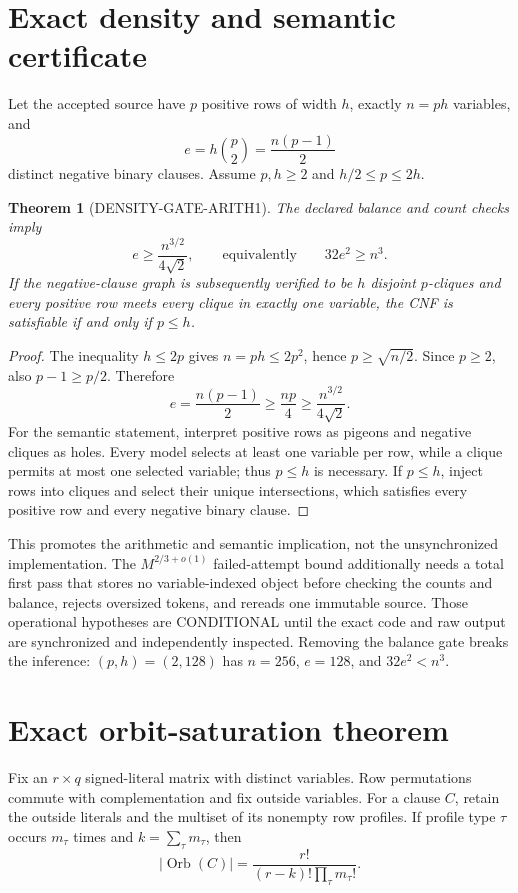 \documentclass[11pt]{article}
\newtheorem{theorem}{Theorem}
\begin{document}
\section{Exact density and semantic certificate}
Let the accepted source have $p$ positive rows of width $h$, exactly
$n=ph$ variables, and
\[
 e=h\binom p2=\frac{n(p-1)}2
\]
distinct negative binary clauses.  Assume $p,h\ge2$ and
$h/2\le p\le2h$.

\begin{theorem}[DENSITY-GATE-ARITH1]
The declared balance and count checks imply
\[
 e\ge \frac{n^{3/2}}{4\sqrt2},
 \qquad\text{equivalently}\qquad 32e^2\ge n^3.
\]
If the negative-clause graph is subsequently verified to be $h$ disjoint
$p$-cliques and every positive row meets every clique in exactly one
variable, the CNF is satisfiable if and only if $p\le h$.
\end{theorem}
\begin{proof}
The inequality $h\le2p$ gives $n=ph\le2p^2$, hence
$p\ge\sqrt{n/2}$.  Since $p\ge2$, also $p-1\ge p/2$.  Therefore
\[
 e=\frac{n(p-1)}2\ge\frac{np}{4}
   \ge\frac{n^{3/2}}{4\sqrt2}.
\]
For the semantic statement, interpret positive rows as pigeons and negative
cliques as holes.  Every model selects at least one variable per row, while a
clique permits at most one selected variable; thus $p\le h$ is necessary.
If $p\le h$, inject rows into cliques and select their unique intersections,
which satisfies every positive row and every negative binary clause.
\end{proof}

This promotes the arithmetic and semantic implication, not the unsynchronized
implementation.  The $M^{2/3+o(1)}$ failed-attempt bound additionally needs
a total first pass that stores no variable-indexed object before checking the
counts and balance, rejects oversized tokens, and rereads one immutable
source.  Those operational hypotheses are CONDITIONAL until the exact code
and raw output are synchronized and independently inspected.  Removing the
balance gate breaks the inference: $(p,h)=(2,128)$ has $n=256$, $e=128$, and
$32e^2<n^3$.

\section{Exact orbit-saturation theorem}
Fix an $r\times q$ signed-literal matrix with distinct variables.  Row
permutations commute with complementation and fix outside variables.  For a
clause $C$, retain the outside literals and the multiset of its nonempty row
profiles.  If profile type $\tau$ occurs $m_\tau$ times and
$k=\sum_\tau m_\tau$, then
\[
 |\operatorname{Orb}(C)|=
 \frac{r!}{(r-k)!\prod_\tau m_\tau!}.
\]
\end{document}
